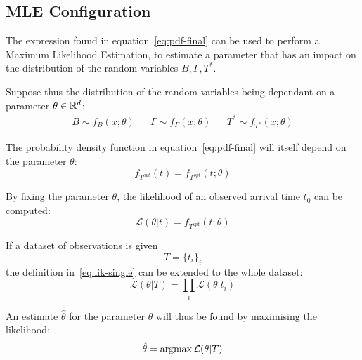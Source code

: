 \subsection{MLE Configuration}

The expression found in equation~\eqref{eq:pdf-final} can be used to perform a Maximum Likelihood Estimation,
to estimate a parameter that has an impact on the distribution of the random variables \(B, \Gamma, T^*\).

Suppose thus the distribution of the random variables being dependant on a parameter \(\theta \in \mathbb{R}^d\):
\begin{align*}
  B \sim f_B(x; \theta) && \Gamma \sim f_\Gamma(x; \theta) && T^* \sim f_{T^*}(x; \theta)
\end{align*}

The probability density function in equation~\eqref{eq:pdf-final} will itself depend on the parameter \(\theta\):
\begin{equation*}
  f_{T^{opt}}(t) = f_{T^{opt}}(t; \theta)
\end{equation*}

By fixing the parameter \(\theta\),
the likelihood of an observed arrival time \(t_0\) can be computed:
\begin{equation}
  \label{eq:lik-single}
  \mathcal{L}(\theta | t) = f_{T^{opt}}(t; \theta)
\end{equation}

If a dataset of observations is given
\begin{equation*}
  T = \{t_i\}_i
\end{equation*}
the definition in~\eqref{eq:lik-single} can be extended to the whole dataset:
\begin{equation}
  \label{eq:lik-final}
  \mathcal{L}(\theta | T) = \prod_i \mathcal{L}(\theta | t_i)
\end{equation}

An estimate \(\hat{\theta}\) for the parameter \(\theta\) will thus be found by maximising the likelihood:
\begin{equation}
  \label{eq:max-lik}
  \hat{\theta} = \operatorname*{argmax} \mathcal{L}(\theta | T)
\end{equation}


